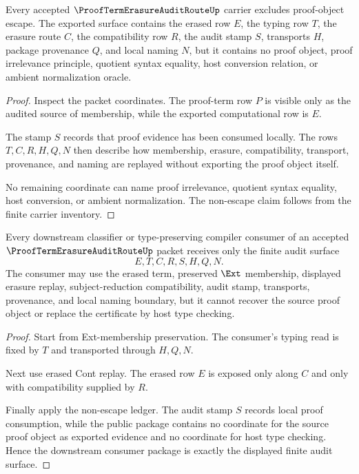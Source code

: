 \begin{theorem}
\label{thm:proofterm-erasure-audit-route-nonescape-ledger}
Every accepted $\ProofTermErasureAuditRouteUp$ carrier excludes proof-object escape. The exported surface contains the erased row $E$, the typing row $T$, the erasure route $C$, the compatibility row $R$, the audit stamp $S$, transports $H$, package provenance $Q$, and local naming $N$, but it contains no proof object, proof irrelevance principle, quotient syntax equality, host conversion relation, or ambient normalization oracle.
\end{theorem}
\begin{proof}
Inspect the packet coordinates. The proof-term row $P$ is visible only as the audited source of membership, while the exported computational row is $E$.

The stamp $S$ records that proof evidence has been consumed locally. The rows $T,C,R,H,Q,N$ then describe how membership, erasure, compatibility, transport, provenance, and naming are replayed without exporting the proof object itself.

No remaining coordinate can name proof irrelevance, quotient syntax equality, host conversion, or ambient normalization. The non-escape claim follows from the finite carrier inventory.
\end{proof}

\begin{theorem}
\label{thm:proofterm-erasure-audit-route-downstream-consumer-package}
Every downstream classifier or type-preserving compiler consumer of an accepted $\ProofTermErasureAuditRouteUp$ packet receives only the finite audit surface
$$
E,T,C,R,S,H,Q,N.
$$
The consumer may use the erased term, preserved $\Ext$ membership, displayed erasure replay, subject-reduction compatibility, audit stamp, transports, provenance, and local naming boundary, but it cannot recover the source proof object or replace the certificate by host type checking.
\end{theorem}
\begin{proof}
Start from Ext-membership preservation. The consumer's typing read is fixed by $T$ and transported through $H,Q,N$.

Next use erased Cont replay. The erased row $E$ is exposed only along $C$ and only with compatibility supplied by $R$.

Finally apply the non-escape ledger. The audit stamp $S$ records local proof consumption, while the public package contains no coordinate for the source proof object as exported evidence and no coordinate for host type checking. Hence the downstream consumer package is exactly the displayed finite audit surface.
\end{proof}

